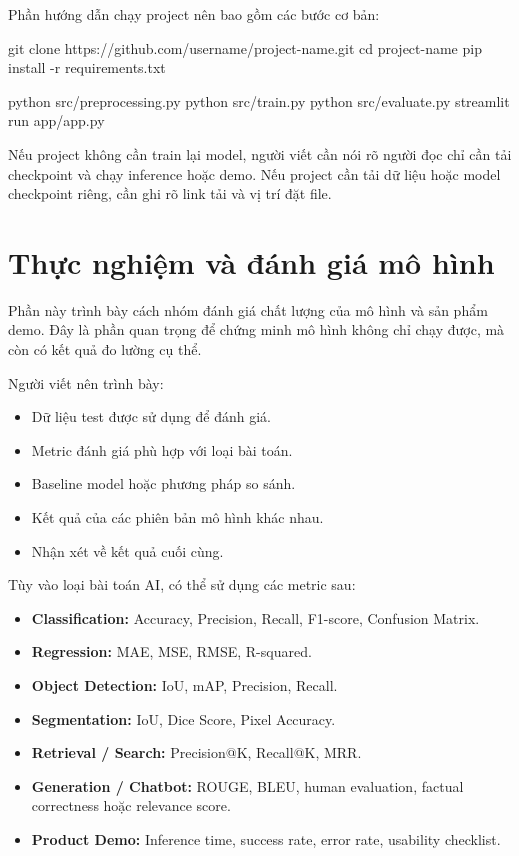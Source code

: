\documentclass[12pt]{ai_conquer2026}
\begin{document}
Phần hướng dẫn chạy project nên bao gồm các bước cơ bản:

\begin{aivncodebox}
\begin{python}
git clone https://github.com/username/project-name.git
cd project-name
pip install -r requirements.txt

python src/preprocessing.py
python src/train.py
python src/evaluate.py
streamlit run app/app.py
\end{python}
\end{aivncodebox}

Nếu project không cần train lại model, người viết cần nói rõ người đọc chỉ cần tải checkpoint và chạy inference hoặc demo. Nếu project cần tải dữ liệu hoặc model checkpoint riêng, cần ghi rõ link tải và vị trí đặt file.

\section{Thực nghiệm và đánh giá mô hình}

Phần này trình bày cách nhóm đánh giá chất lượng của mô hình và sản phẩm demo. Đây là phần quan trọng để chứng minh mô hình không chỉ chạy được, mà còn có kết quả đo lường cụ thể.

Người viết nên trình bày:

\begin{itemize}
\item Dữ liệu test được sử dụng để đánh giá.
\item Metric đánh giá phù hợp với loại bài toán.
\item Baseline model hoặc phương pháp so sánh.
\item Kết quả của các phiên bản mô hình khác nhau.
\item Nhận xét về kết quả cuối cùng.
\end{itemize}

Tùy vào loại bài toán AI, có thể sử dụng các metric sau:

\begin{itemize}
\item \textbf{Classification:} Accuracy, Precision, Recall, F1-score, Confusion Matrix.
\item \textbf{Regression:} MAE, MSE, RMSE, R-squared.
\item \textbf{Object Detection:} IoU, mAP, Precision, Recall.
\item \textbf{Segmentation:} IoU, Dice Score, Pixel Accuracy.
\item \textbf{Retrieval / Search:} Precision@K, Recall@K, MRR.
\item \textbf{Generation / Chatbot:} ROUGE, BLEU, human evaluation, factual correctness hoặc relevance score.
\item \textbf{Product Demo:} Inference time, success rate, error rate, usability checklist.
\end{itemize}
\end{document}
